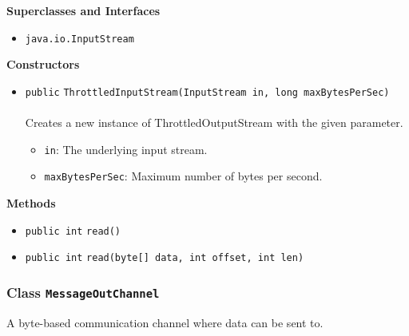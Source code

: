 \textbf{\sffamily Superclasses and Interfaces}
\begin{itemize}
\item \lstinline|java.io.InputStream|
\end{itemize}


\textbf{\sffamily Constructors}
\begin{itemize}
\item \lstinline|public| \lstinline|ThrottledInputStream|\lstinline|(InputStream in, long maxBytesPerSec)|\\ \\[-0.6em]
Creates a new instance of ThrottledOutputStream with the given parameter.
\begin{itemize}
\item \lstinline|in|: The underlying input stream.
\item \lstinline|maxBytesPerSec|: Maximum number of bytes per second.
\end{itemize}



\end{itemize}


\textbf{\sffamily Methods}
\begin{itemize}
\item \lstinline|public int| \lstinline|read|\lstinline|()| \\[-0.6em]




\item \lstinline|public int| \lstinline|read|\lstinline|(byte[] data, int offset, int len)| \\[-0.6em]




\end{itemize}

\subsubsection{Class \lstinline|MessageOutChannel|}
A byte-based communication channel where data can be sent to. \\
\noindent\begin{minipage}[t]{5cm}
\vspace{0.3em}
\hspace*{2em}
\vspace{0.3em}
\end{minipage}





